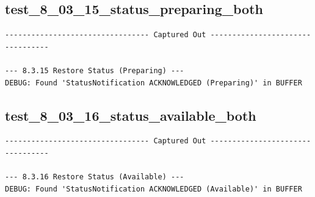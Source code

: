 \documentclass{article}
\begin{document}
\subsection*{test\_8\_03\_15\_status\_preparing\_both}
\begin{lstlisting}
--------------------------------- Captured Out ---------------------------------

--- 8.3.15 Restore Status (Preparing) ---
DEBUG: Found 'StatusNotification ACKNOWLEDGED (Preparing)' in BUFFER
\end{lstlisting}
\subsection*{test\_8\_03\_16\_status\_available\_both}
\begin{lstlisting}
--------------------------------- Captured Out ---------------------------------

--- 8.3.16 Restore Status (Available) ---
DEBUG: Found 'StatusNotification ACKNOWLEDGED (Available)' in BUFFER
\end{lstlisting}
\end{document}
